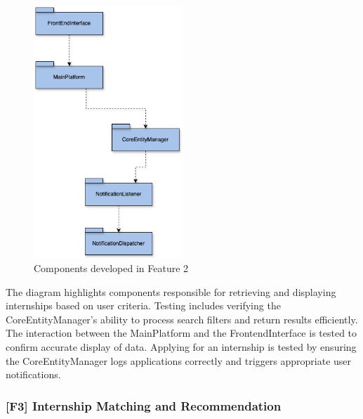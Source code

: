 \begin{figure}[H]
    \centering
    \includegraphics[width=0.5\textwidth]{Images/implementation-testing-hierarchy_f2.png}
    \caption{Components developed in Feature 2}
    \label{fig:implementation_testing_f2}
\end{figure}

The diagram highlights components responsible for retrieving and displaying internships based on user criteria. Testing includes verifying the CoreEntityManager's ability to process search filters and return results efficiently. The interaction between the MainPlatform and the FrontendInterface is tested to confirm accurate display of data. Applying for an internship is tested by ensuring the CoreEntityManager logs applications correctly and triggers appropriate user notifications.


\subsubsection{[F3] Internship Matching and Recommendation}

